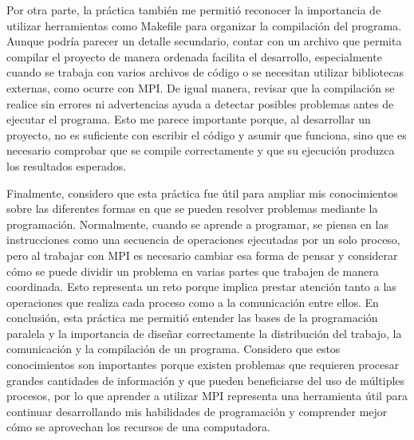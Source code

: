 Por otra parte, la práctica también me permitió reconocer la importancia de utilizar herramientas como Makefile para organizar la compilación del programa. Aunque podría parecer un detalle secundario, contar con un archivo que permita compilar el proyecto de manera ordenada facilita el desarrollo, especialmente cuando se trabaja con varios archivos de código o se necesitan utilizar bibliotecas externas, como ocurre con MPI. De igual manera, revisar que la compilación se realice sin errores ni advertencias ayuda a detectar posibles problemas antes de ejecutar el programa. Esto me parece importante porque, al desarrollar un proyecto, no es suficiente con escribir el código y asumir que funciona, sino que es necesario comprobar que se compile correctamente y que su ejecución produzca los resultados esperados.

Finalmente, considero que esta práctica fue útil para ampliar mis conocimientos sobre las diferentes formas en que se pueden resolver problemas mediante la programación. Normalmente, cuando se aprende a programar, se piensa en las instrucciones como una secuencia de operaciones ejecutadas por un solo proceso, pero al trabajar con MPI es necesario cambiar esa forma de pensar y considerar cómo se puede dividir un problema en varias partes que trabajen de manera coordinada. Esto representa un reto porque implica prestar atención tanto a las operaciones que realiza cada proceso como a la comunicación entre ellos. En conclusión, esta práctica me permitió entender las bases de la programación paralela y la importancia de diseñar correctamente la distribución del trabajo, la comunicación y la compilación de un programa. Considero que estos conocimientos son importantes porque existen problemas que requieren procesar grandes cantidades de información y que pueden beneficiarse del uso de múltiples procesos, por lo que aprender a utilizar MPI representa una herramienta útil para continuar desarrollando mis habilidades de programación y comprender mejor cómo se aprovechan los recursos de una computadora.
